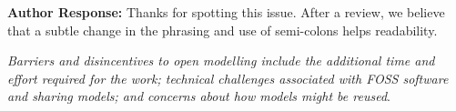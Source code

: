 \documentclass{article}
\begin{document}
\vspace{0.5cm}


\vspace{0.2cm}

\noindent\textbf{Author Response:} Thanks for spotting this issue.  After a review, we believe that a subtle change in the phrasing and use of semi-colons helps readability.

\vspace{0.2cm}

{\color{red}\textit{Barriers and disincentives to open modelling include the additional time and effort required for the work; technical challenges associated with FOSS software and sharing models; and concerns about how models might be reused}.}
\end{document}
